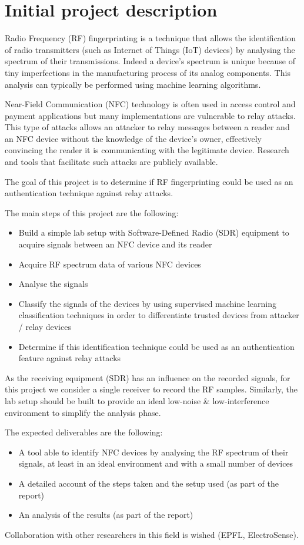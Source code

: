 \section{Initial project description}

Radio Frequency (RF) fingerprinting is a technique that allows the identification of radio transmitters (such as Internet of Things (IoT) devices) by analysing the spectrum of their transmissions. Indeed a device's spectrum is unique because of tiny imperfections in the manufacturing process of its analog components. This analysis can typically be performed using machine learning algorithms.

Near-Field Communication (NFC) technology is often used in access control and payment applications but many implementations are vulnerable to relay attacks. This type of attacks allows an attacker to relay messages between a reader and an NFC device without the knowledge of the device's owner, effectively convincing the reader it is communicating with the legitimate device. Research and tools that facilitate such attacks are publicly available.

The goal of this project is to determine if RF fingerprinting could be used as an authentication technique against relay attacks.

The main steps of this project are the following:

\begin{itemize}
  \item Build a simple lab setup with Software-Defined Radio (SDR) equipment to acquire signals between an NFC device and its reader
  \item Acquire RF spectrum data of various NFC devices
  \item Analyse the signals
  \item Classify the signals of the devices by using supervised machine learning classification techniques in order to differentiate trusted devices from attacker / relay devices
  \item Determine if this identification technique could be used as an authentication feature against relay attacks
\end{itemize}

As the receiving equipment (SDR) has an influence on the recorded signals, for this project we consider a single receiver to record the RF samples. Similarly, the lab setup should be built to provide an ideal low-noise \& low-interference environment to simplify the analysis phase.

The expected deliverables are the following:

\begin{itemize}
  \item A tool able to identify NFC devices by analysing the RF spectrum of their signals, at least in an ideal environment and with a small number of devices
  \item A detailed account of the steps taken and the setup used (as part of the report)
  \item An analysis of the results (as part of the report)
\end{itemize}

Collaboration with other researchers in this field is wished (EPFL, ElectroSense).
